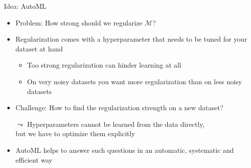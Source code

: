 \documentclass[aspectratio=169]{../latex_main/tntbeamer}  %
\begin{document}
	\begin{frame}[c]{Idea: AutoML}
	    
	    \begin{itemize}
	        \item Problem: How strong should we regularize $\mathcal{M}$?
	        \bigskip
	        \item Regularization comes with a hyperparameter that needs to be tuned for your dataset at hand
	        \begin{itemize}
	            \item Too strong regularization can hinder learning at all
	            \item On very noisy datasets you want more regularization than on less noisy datasets
	        \end{itemize}
	        \item Challenge: How to find the regularization strength on a new dataset?
	        \item[$\leadsto$] Hyperparameters cannot be learned from the data directly,\\ but we have to optimize them explicitly
	        \item AutoML helps to answer such questions in an automatic, systematic and efficient way
	    \end{itemize}
	\end{frame}
	
\end{document}
